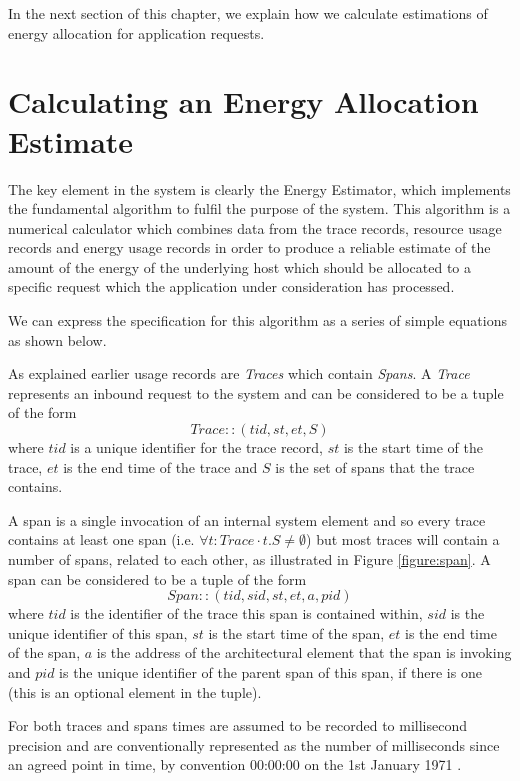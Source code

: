 In the next section of this chapter, we explain how we calculate estimations of energy allocation for application requests.

\section{Calculating an Energy Allocation Estimate}

The key element in the system is clearly the Energy Estimator, which implements the fundamental algorithm to fulfil the purpose of the system.  This algorithm is a numerical calculator which combines data from the trace records, resource usage records and energy usage records in order to produce a reliable estimate of the amount of the energy of the underlying host which should be allocated to a specific request which the application under consideration has processed.

We can express the specification for this algorithm as a series of simple equations as shown below.

As explained earlier usage records are \emph{Traces} which contain \emph{Spans}.  A \emph{Trace} represents an inbound request to the system and can be considered to be a tuple of the form 
\begin{equation}
Trace :: (tid, st, et, S)
\end{equation}
where $tid$ is a unique identifier for the trace record, $st$ is the start time of the trace, $et$ is the end time of the trace and $S$ is the set of spans that the trace contains.  

A span is a single invocation of an internal system element and so every trace contains at least one span (i.e. $\forall t : Trace \cdot t.S \neq \emptyset$) but most traces will contain a number of spans, related to each other, as illustrated in Figure \ref{figure:span}.  A span can be considered to be a tuple of the form
\begin{equation}
Span :: (tid, sid, st, et, a, pid)
\end{equation}
where $tid$ is the identifier of the trace this span is contained within, $sid$ is the unique identifier of this span, $st$ is the start time of the span, $et$ is the end time of the span, $a$ is the address of the architectural element that the span is invoking and $pid$ is the unique identifier of the parent span of this span, if there is one (this is an optional element in the tuple).

For both traces and spans times are assumed to be recorded to millisecond precision and are conventionally represented as the number of milliseconds since an agreed point in time, by convention 00:00:00 on the 1st January 1971 \cite{josey2004-ieee1003}.

